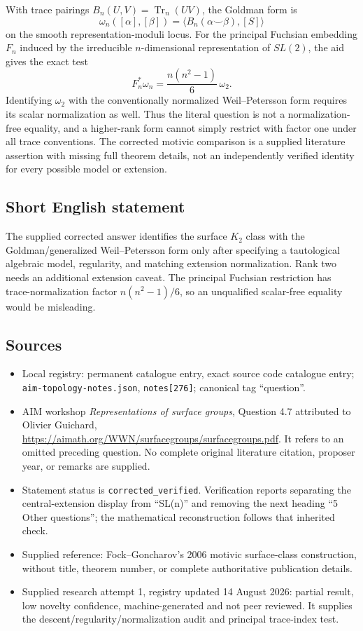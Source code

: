 \documentclass[11pt]{article}
\begin{document}
With trace pairings $B_n(U,V)=\operatorname{Tr}_n(UV)$, the Goldman form is
\[
\omega_n([\alpha],[\beta])=\langle B_n(\alpha\smile\beta),[S]\rangle
\]
on the smooth representation-moduli locus. For the principal Fuchsian embedding $F_n$ induced by the irreducible $n$-dimensional representation of $SL(2)$, the aid gives the exact test
\[
F_n^*\omega_n=\frac{n(n^2-1)}6\,\omega_2.
\]
Identifying $\omega_2$ with the conventionally normalized Weil--Petersson form requires its scalar normalization as well. Thus the literal question is not a normalization-free equality, and a higher-rank form cannot simply restrict with factor one under all trace conventions. The corrected motivic comparison is a supplied literature assertion with missing full theorem details, not an independently verified identity for every possible model or extension.
\subsection{Short English statement}
The supplied corrected answer identifies the surface $K_2$ class with the Goldman/generalized Weil--Petersson form only after specifying a tautological algebraic model, regularity, and matching extension normalization. Rank two needs an additional extension caveat. The principal Fuchsian restriction has trace-normalization factor $n(n^2-1)/6$, so an unqualified scalar-free equality would be misleading.
\subsection{Sources}
\begin{itemize}
\item Local registry: permanent catalogue entry, exact source code catalogue entry; \texttt{aim-topology-notes.json}, \texttt{notes[276]}; canonical tag ``question''.
\item AIM workshop \emph{Representations of surface groups}, Question 4.7 attributed to Olivier Guichard, \url{https://aimath.org/WWN/surfacegroups/surfacegroups.pdf}. It refers to an omitted preceding question. No complete original literature citation, proposer year, or remarks are supplied.
\item Statement status is \texttt{corrected\_verified}. Verification reports separating the central-extension display from ``SL(n)'' and removing the next heading ``5 Other questions''; the mathematical reconstruction follows that inherited check.
\item Supplied reference: Fock--Goncharov's 2006 motivic surface-class construction, without title, theorem number, or complete authoritative publication details.
\item Supplied research attempt 1, registry updated 14 August 2026: partial result, low novelty confidence, machine-generated and not peer reviewed. It supplies the descent/regularity/normalization audit and principal trace-index test.
\end{itemize}
\end{document}
